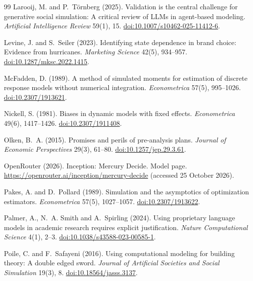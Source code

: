 \documentclass[11pt]{article}
\begin{document}
\begin{thebibliography}{99}
Larooij, M. and P.~T{\"o}rnberg (2025).
Validation is the central challenge for generative social simulation: A critical review of {LLM}s
in agent-based modeling.
\emph{Artificial Intelligence Review} 59(1), 15.
\href{https://doi.org/10.1007/s10462-025-11412-6}{doi:10.1007/s10462-025-11412-6}.

Levine, J. and S.~Seiler (2023).
Identifying state dependence in brand choice: Evidence from hurricanes.
\emph{Marketing Science} 42(5), 934--957.
\href{https://doi.org/10.1287/mksc.2022.1415}{doi:10.1287/mksc.2022.1415}.

McFadden, D. (1989).
A method of simulated moments for estimation of discrete response models without numerical
integration.
\emph{Econometrica} 57(5), 995--1026.
\href{https://doi.org/10.2307/1913621}{doi:10.2307/1913621}.

Nickell, S. (1981).
Biases in dynamic models with fixed effects.
\emph{Econometrica} 49(6), 1417--1426.
\href{https://doi.org/10.2307/1911408}{doi:10.2307/1911408}.

Olken, B.~A. (2015).
Promises and perils of pre-analysis plans.
\emph{Journal of Economic Perspectives} 29(3), 61--80.
\href{https://doi.org/10.1257/jep.29.3.61}{doi:10.1257/jep.29.3.61}.

OpenRouter (2026).
Inception: Mercury Decide. Model page.
\url{https://openrouter.ai/inception/mercury-decide} (accessed 25 October 2026).

Pakes, A. and D.~Pollard (1989).
Simulation and the asymptotics of optimization estimators.
\emph{Econometrica} 57(5), 1027--1057.
\href{https://doi.org/10.2307/1913622}{doi:10.2307/1913622}.

Palmer, A., N.~A. Smith and A.~Spirling (2024).
Using proprietary language models in academic research requires explicit justification.
\emph{Nature Computational Science} 4(1), 2--3.
\href{https://doi.org/10.1038/s43588-023-00585-1}{doi:10.1038/s43588-023-00585-1}.

Poile, C. and F.~Safayeni (2016).
Using computational modeling for building theory: A double edged sword.
\emph{Journal of Artificial Societies and Social Simulation} 19(3), 8.
\href{https://doi.org/10.18564/jasss.3137}{doi:10.18564/jasss.3137}.


\end{thebibliography}
\end{document}
